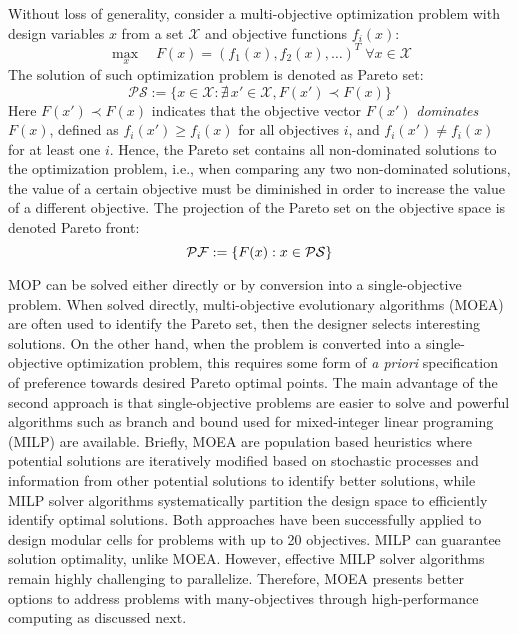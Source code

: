 {Without loss of generality, consider a multi-objective optimization problem with design variables $x$ from a set $\mathcal{X}$ and objective functions $f_i(x)$:
\begin{equation*}
    \underset{ \;x}{\max} \quad F(x) = (f_1(x), f_2(x), \ldots)^T \; \forall x \in \mathcal{X}
\end{equation*}
The solution of such optimization problem is denoted as Pareto set:
\begin{equation*}
    \mathcal{PS}:=\{x \in \mathcal{X}:\nexists \, x' \in \mathcal{X}, F(x') \prec F(x)\} \label{eq7:ps}
\end{equation*}
Here $F(x') \prec F(x)$ indicates that the objective vector $F(x')$ \emph{dominates} $F(x)$, defined as $f_i(x') \ge f_i(x)$ for all objectives $i$, and $f_i(x') \ne f_i(x)$ for at least one $i$. Hence, the Pareto set contains all non-dominated solutions to the optimization problem, i.e., when comparing any two non-dominated solutions, the value of a certain objective must be diminished in order to increase the value of a different objective. The projection of the Pareto set on the objective space is denoted Pareto front: %
\begin{equation*}
    \mathcal{PF}:=\{F(x): x \in \mathcal{PS} \}
\end{equation*}

MOP can be solved either directly or by conversion into a single-objective problem.\citep{marler2004}  When solved directly, multi-objective evolutionary algorithms (MOEA) are often used to identify the Pareto set, then the designer selects interesting solutions.
On the other hand, when the problem is converted into a single-objective optimization problem, this requires some form of \textit{a priori} specification of preference towards desired Pareto optimal points.
The main advantage of the second approach is that single-objective problems are easier to solve and powerful algorithms such as branch and bound used for mixed-integer linear programing (MILP) are available. %
Briefly, MOEA are population based heuristics where potential solutions are iteratively modified based on stochastic processes and information from other potential solutions to identify better solutions, while MILP solver algorithms systematically partition the design space to efficiently identify optimal solutions.
Both approaches have been successfully applied to design modular cells for problems with up to 20 objectives.\citep{garcia2019, garcia2019c, garcia2019d}
MILP can guarantee solution optimality, unlike MOEA. However, effective MILP solver algorithms remain highly challenging to parallelize. \citep{ralphs2016} %
Therefore, MOEA presents better options to address problems with many-objectives through high-performance computing as discussed next.

}
